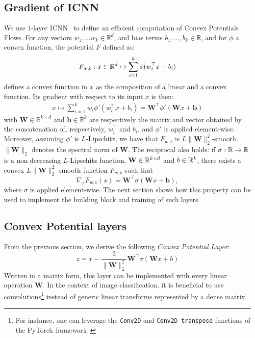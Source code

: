 \subsection{Gradient of ICNN}
We use $1$-layer ICNN~\citep{amos2017input} to define an efficient computation of Convex Potentials Flows. For any vectors $w_1,\dots w_k\in\mathbb{R}^d$, and bias terms  $b_1,\dots,b_k\in \mathbb{R}$, and for $\phi$ a convex function,  the potential $F$ defined as:
\begin{align*}
    F_{w,b}:x\in\mathbb{R}^d\mapsto \sum_{i=1}^k\phi( w_i^\top x+b_i)
\end{align*}
defines  a convex function in $x$ as the composition of a linear and a convex function. Its gradient with respect to its input $x$ is then:
\begin{align*}
    x\mapsto \sum_{i=1}^kw_i\phi'(w_i^\top x+b_i) = \mathbf{W}^\top \phi'(\mathbf{W} x+\mathbf{b})
\end{align*}
with $\mathbf{W}\in \mathbb{R}^{k\times d}$ and $\mathbf{b}\in\mathbb{R}^{k}$ are respectively the matrix and vector obtained by the concatenation of, respectively, $w_i^\top$ and $b_i$, and $\phi'$ is applied element-wise.  
Moreover, assuming $\phi'$ is $L$-Lipschitz, we have that $F_{w,b}$ is  $L\lVert\mathbf{W}\rVert_2^2$-smooth. $\lVert\mathbf{W}\rVert_2$ denotes the spectral norm of $\mathbf{W}$.
The reciprocal also holds: if $\sigma:\mathbb{R}\to\mathbb{R}$ is a non-decreasing $L$-Lipschitz function, $\mathbf{W}\in \mathbb{R}^{k\times d}$ and $b\in \mathbb{R}^{k}$, there exists a convex $L\lVert\mathbf{W}\rVert_2^2$-smooth function $F_{w,b}$ such that 
$$\nabla_xF_{w,b}(x) =  \mathbf{W}^\top \sigma(\mathbf{W} x+\mathbf{b}),$$ where $\sigma$ is applied element-wise. The next section shows how this property can be used to implement the building block and training of such layers. 


\subsection{Convex Potential layers}
From the previous section, we derive the following \emph{Convex Potential Layer}: 
\begin{equation*}
\label{equation:stable_block}
  z = x - \frac{2}{\lVert \mathbf{W} \lVert_2^2} \mathbf{W}^\top \sigma(\mathbf{W} x + b)
\end{equation*}
Written in a matrix form, this layer can be implemented with every linear operation $\mathbf{W}$.
In the context of image classification, it is beneficial to use convolutions\footnote{For instance, one can leverage the \texttt{Conv2D} and \texttt{Conv2D\_transpose} functions of the PyTorch framework~\citep{paszke2019pytorch}} instead of generic linear transforms represented by a dense matrix. 

